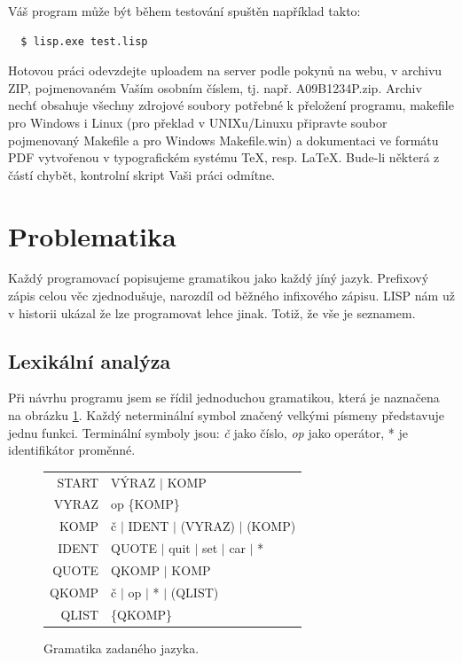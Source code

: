 \documentclass[a4paper, 12pt]{article}
\begin{document}
Váš program může být během testování spuštěn například takto:
\begin{verbatim}
  $ lisp.exe test.lisp
\end{verbatim}

Hotovou práci odevzdejte uploadem na server podle pokynů na webu, v
archivu ZIP, pojmenovaném Vaším osobním číslem, tj. např.
\textsf{A09B1234P.zip}. Archiv nechť obsahuje všechny zdrojové soubory
potřebné k přeložení programu, \textsf{makefile} pro Windows i Linux
(pro překlad v UNIXu/Linuxu připravte soubor pojmenovaný
\textsf{Makefile} a pro Windows \textsf{Makefile.win}) a dokumentaci
ve formátu PDF vytvořenou v typografickém systému \TeX{}, resp.
\LaTeX{}. Bude-li některá z částí chybět, kontrolní skript Vaši práci
odmítne.

\section{Problematika}
Každý programovací popisujeme gramatikou jako každý jíný jazyk.
Prefixový zápis celou věc zjednodušuje, narozdíl od běžného infixového
zápisu. LISP nám už v historii ukázal že lze programovat lehce jinak.
Totiž, že vše je seznamem.

\subsection{Lexikální analýza}
Při návrhu programu jsem se řídil jednoduchou gramatikou, která je
naznačena na obrázku \ref{fig:gram}. Každý neterminální symbol značený
velkými písmeny představuje jednu funkci. Terminální symboly jsou:
\emph{č} jako číslo, \emph{op} jako operátor, * je identifikátor
proměnné.

\begin{figure}
\centering
\begin{tabular}{r@{$\quad\longrightarrow\quad$}l}
START & VÝRAZ $|$ KOMP\\
VYRAZ & op \{KOMP\}\\
KOMP & č $|$ IDENT $|$ (VYRAZ) $|$ (KOMP)\\
IDENT & QUOTE $|$ quit $|$ set $|$ car $|$ *\\[1ex]
QUOTE & QKOMP $|$ KOMP\\
QKOMP & č $|$ op $|$ * $|$ (QLIST)\\
QLIST & \{QKOMP\}

\end{tabular}

\caption{Gramatika zadaného jazyka.}
\label{fig:gram}
\end{figure}
\end{document}
